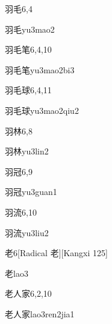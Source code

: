 \begin{entry}{羽毛}{6,4}
  \begin{phonetics}{羽毛}{yu3mao2}
  \end{phonetics}
\end{entry}

\begin{entry}{羽毛笔}{6,4,10}
  \begin{phonetics}{羽毛笔}{yu3mao2bi3}
  \end{phonetics}
\end{entry}

\begin{entry}{羽毛球}{6,4,11}
  \begin{phonetics}{羽毛球}{yu3mao2qiu2}
  \end{phonetics}
\end{entry}

\begin{entry}{羽林}{6,8}
  \begin{phonetics}{羽林}{yu3lin2}
  \end{phonetics}
\end{entry}

\begin{entry}{羽冠}{6,9}
  \begin{phonetics}{羽冠}{yu3guan1}
  \end{phonetics}
\end{entry}

\begin{entry}{羽流}{6,10}
  \begin{phonetics}{羽流}{yu3liu2}
  \end{phonetics}
\end{entry}

\begin{entry}{老}{6}[Radical 老][Kangxi 125]
  \begin{phonetics}{老}{lao3}
  \end{phonetics}
\end{entry}

\begin{entry}{老人家}{6,2,10}
  \begin{phonetics}{老人家}{lao3ren2jia1}
  \end{phonetics}
\end{entry}

